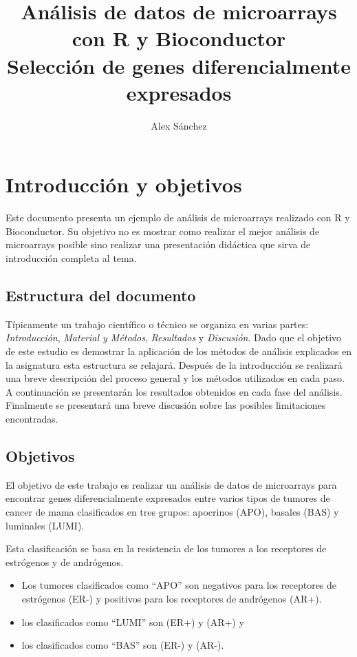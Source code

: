 \documentclass[a4paper]{article}\usepackage[]{graphicx}\usepackage[]{color}
\title{Análisis de datos de microarrays con R y Bioconductor\\
Selección de genes diferencialmente expresados}
\author{Alex Sánchez}
\begin{document}

\maketitle

\tableofcontents

\section{Introducción y objetivos}

Este documento presenta un ejemplo de análisis de microarrays realizado con R y Bioconductor. Su objetivo no es mostrar como realizar el mejor análisis de microarrays posible sino realizar una presentación didáctica que sirva de introducción completa al tema.

\subsection{Estructura del documento}

Típicamente un trabajo científico o técnico se organiza en varias partes: \emph{Introducción}, \emph{Material y Métodos}, \emph{Resultados} y \emph{Discusión}. Dado que el objetivo de este estudio es demostrar la aplicación de los métodos de análisis explicados en la asignatura esta estructura se relajará. Después de la introducción se realizará una breve descripción del proceso general y los métodos utilizados en cada paso. A continuación se presentarán los resultados obtenidos en cada fase del análisis. Finalmente se presentará una breve discusión sobre las posibles limitaciones encontradas.

\subsection{Objetivos}

El objetivo de este trabajo es realizar un análisis de datos de microarrays para encontrar genes diferencialmente expresados entre varios tipos de tumores de cancer de mama clasificados en tres grupos: apocrinos (APO), basales (BAS) y luminales (LUMI). 

Esta clasificación se basa en la resistencia de los tumores a los receptores de estrógenos y de andrógenos. 
\begin{itemize}
\item Los tumores clasificados como ``APO'' son negativos para los receptores de estrógenos (ER-) y positivos para los receptores de andrógenos (AR+).
\item  los clasificados como ``LUMI'' son (ER+) y (AR+) y
\item los clasificados como ``BAS'' son (ER-) y (AR-).
\end{itemize}
\end{document}
